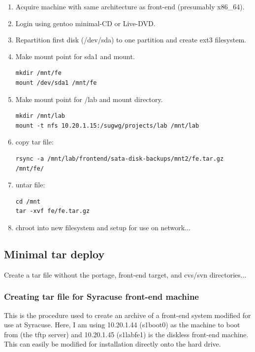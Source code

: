 \begin{enumerate}
    \item Acquire machine with same architecture as front-end (presumably x86\_64).
    \item Login using gentoo minimal-CD or Live-DVD.
    \item Repartition first disk (/dev/sda) to one partition and create ext3 filesystem.
    \item Make mount point for sda1 and mount.
%
\begin{lstlisting}
mkdir /mnt/fe
mount /dev/sda1 /mnt/fe
\end{lstlisting}
%
    \item Make mount point for /lab and mount directory.

\begin{lstlisting}
mkdir /mnt/lab
mount -t nfs 10.20.1.15:/sugwg/projects/lab /mnt/lab
\end{lstlisting}

    \item copy tar file:

\begin{lstlisting}
rsync -a /mnt/lab/frontend/sata-disk-backups/mnt2/fe.tar.gz /mnt/fe/
\end{lstlisting}

    \item untar file:

\begin{lstlisting}
cd /mnt
tar -xvf fe/fe.tar.gz
\end{lstlisting}

    \item chroot into new filesystem and setup for use on network...
\end{enumerate}


\subsection{Minimal tar deploy}

Create a tar file without the portage, front-end target, and cvs/svn directories...

\subsubsection{Creating tar file for Syracuse front-end machine}

This is the procedure used to create an archive of a front-end system modified for use at Syracuse. Here, I am using 10.20.1.44 (s1boot0) as the machine to boot from (the tftp server) and 10.20.1.45 (s1labfe1) is the diskless front-end machine. This can easily be modified for installation directly onto the hard drive.


